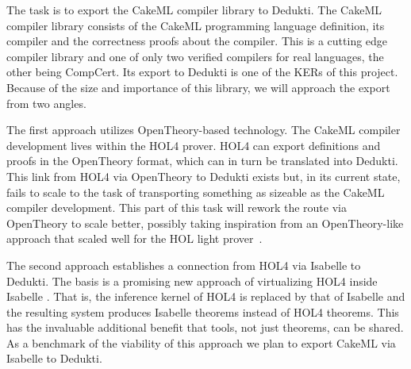 \begin{workpackage}[id=libraries,wphases=0-48,type=RTD,
  short=Libraries,%
  title=Libraries,
  lead=Inr,
  InrRM=10,
  TumRM=39]
\begin{tasklist}
\begin{task}[id=cakeml,title=The CakeML compiler library]
The task is to export the CakeML compiler library to Dedukti.  The
CakeML compiler library consists of the CakeML programming language
definition, its compiler and the correctness proofs about the
compiler. This is a cutting edge compiler library and one of only two
verified compilers for real languages, the other being CompCert. Its
export to Dedukti is one of the KERs of this project. Because of the
size and importance of this library, we will approach the export from
two angles.

The first approach utilizes OpenTheory-based technology. The CakeML
compiler development lives within the HOL4 prover. HOL4 can export
definitions and proofs in the OpenTheory format, which can in turn be
translated into Dedukti. This link from HOL4 via OpenTheory to Dedukti
exists but, in its current state, fails to scale to the task of
transporting something as sizeable as the CakeML compiler
development. This part of this task will rework the route via
OpenTheory to scale better, possibly taking inspiration from an
OpenTheory-like approach that scaled well for the HOL light
prover~\cite{KaliszykK13}.

The second approach establishes a connection from HOL4 via Isabelle to
Dedukti. The basis is a promising new approach of virtualizing HOL4
inside Isabelle \cite{ImmlerRW19}. That is, the inference
kernel of HOL4 is replaced by that of Isabelle and the resulting
system produces Isabelle theorems instead of HOL4 theorems. This has
the invaluable additional benefit that tools, not just theorems, can
be shared. As a benchmark of the viability of this approach we plan to
export CakeML via Isabelle to Dedukti.
\end{task}

\begin{task}[id=unimath,title=The UniMath library]
\end{task}


\end{tasklist}


\end{workpackage}
